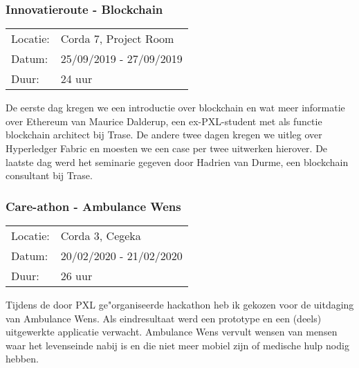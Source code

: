 \subsubsection{Innovatieroute - Blockchain}

\begin{tabular}{l l}
  Locatie: & Corda 7, Project Room\\
  Datum: & 25/09/2019 - 27/09/2019\\
  Duur: & 24 uur
\end{tabular}

De eerste dag kregen we een introductie over blockchain en wat meer informatie over Ethereum van Maurice Dalderup, een ex\hyp{}PXL\hyp{}student met als functie blockchain architect bij Trase. De andere twee dagen kregen we uitleg over Hyperledger Fabric en moesten we een case per twee uitwerken hierover. De laatste dag werd het seminarie gegeven door Hadrien van Durme, een blockchain consultant bij Trase.

\subsubsection{Care\hyp{}athon - Ambulance Wens}

\begin{tabular}{l l}
  Locatie: & Corda 3, Cegeka\\
  Datum: & 20/02/2020 - 21/02/2020\\
  Duur: & 26 uur
\end{tabular}

Tijdens de door PXL ge"organiseerde hackathon heb ik gekozen voor de uitdaging van Ambulance Wens. Als eindresultaat werd een prototype en een (deels) uitgewerkte applicatie verwacht. Ambulance Wens vervult wensen van mensen waar het levenseinde nabij is en die niet meer mobiel zijn of medische hulp nodig hebben.
